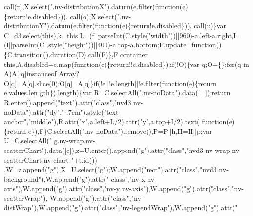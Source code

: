 \begin{DoxyCode}
      call(r),X.select(\textcolor{stringliteral}{".nv-distributionX"}).datum(e.filter(\textcolor{keyword}{function}(e)\{return!e.disabled\})).
      call(o),X.select(\textcolor{stringliteral}{".nv-distributionY"}).datum(e.filter(\textcolor{keyword}{function}(e)\{return!e.disabled\})).
      call(u)\}var C=d3.select(\textcolor{keyword}{this}),k=\textcolor{keyword}{this},L=(f||parseInt(C.style(\textcolor{stringliteral}{"width"}))||960)-a.left-a.right,I=(l||parseInt(C
      .style(\textcolor{stringliteral}{"height"}))||400)-a.top-a.bottom;F.update=\textcolor{keyword}{function}()\{C.transition().duration(D).call(F)\},F.container=\textcolor{keyword}{
      this},A.disabled=e.map(\textcolor{keyword}{function}(e)\{\textcolor{keywordflow}{return}!!e.disabled\});\textcolor{keywordflow}{if}(!O)\{var q;O=\{\};\textcolor{keywordflow}{for}(q in A)A[
      q]instanceof Array?O[q]=A[q].slice(0):O[q]=A[q]\}\textcolor{keywordflow}{if}(!e||!e.length||!e.filter(\textcolor{keyword}{function}(e)\{return e.values.len
      gth\}).length)\{var R=C.selectAll(\textcolor{stringliteral}{".nv-noData"}).data([\_]);\textcolor{keywordflow}{return} R.enter().append(\textcolor{stringliteral}{"text"}).attr(\textcolor{stringliteral}{"class"},\textcolor{stringliteral}{"nvd3
       nv-noData"}).attr(\textcolor{stringliteral}{"dy"},\textcolor{stringliteral}{"-.7em"}).style(\textcolor{stringliteral}{"text-anchor"},\textcolor{stringliteral}{"middle"}),R.attr(\textcolor{stringliteral}{"x"},a.left+L/2).attr(\textcolor{stringliteral}{"y"},a.top+I/2).text(\textcolor{keyword}{
      function}(e)\{\textcolor{keywordflow}{return} e\}),F\}C.selectAll(\textcolor{stringliteral}{".nv-noData"}).remove(),P=P||h,H=H||p;var U=C.selectAll(\textcolor{stringliteral}{"
      g.nv-wrap.nv-scatterChart"}).data([e]),z=U.enter().append(\textcolor{stringliteral}{"g"}).attr(\textcolor{stringliteral}{"class"},\textcolor{stringliteral}{"nvd3 nv-wrap nv-scatterChart nv-chart-"}+t.id())
      ,W=z.append(\textcolor{stringliteral}{"g"}),X=U.select(\textcolor{stringliteral}{"g"});W.append(\textcolor{stringliteral}{"rect"}).attr(\textcolor{stringliteral}{"class"},\textcolor{stringliteral}{"nvd3 nv-background"}),W.append(\textcolor{stringliteral}{"g"}).attr(\textcolor{stringliteral}{"
      class"},\textcolor{stringliteral}{"nv-x nv-axis"}),W.append(\textcolor{stringliteral}{"g"}).attr(\textcolor{stringliteral}{"class"},\textcolor{stringliteral}{"nv-y nv-axis"}),W.append(\textcolor{stringliteral}{"g"}).attr(\textcolor{stringliteral}{"class"},\textcolor{stringliteral}{"nv-scatterWrap"}),
      W.append(\textcolor{stringliteral}{"g"}).attr(\textcolor{stringliteral}{"class"},\textcolor{stringliteral}{"nv-distWrap"}),W.append(\textcolor{stringliteral}{"g"}).attr(\textcolor{stringliteral}{"class"},\textcolor{stringliteral}{"nv-legendWrap"}),W.append(\textcolor{stringliteral}{"g"}).attr(\textcolor{stringliteral}{"
}
\end{DoxyCode}
